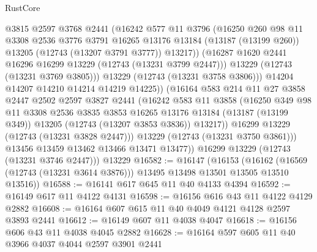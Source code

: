 \begin{lexlean}{RustCore}
\begin{coremodule}
                    @3815
                    @2597
                    @3768
                    @2441
                    (@16242
                      @577
                      @11
                      @3796
                      (@16250
                        @260
                        @98
                        @11
                        @3308
                        @2536
                        @3776
                        @3791
                        @16265
                        @13176
                        @13184
                        (@13187 (@13199 @260))
                        @13205
                        (@12743 (@13207 @3791 @3777))
                        @13217))
                    (@16287 @1620 @2441 @16296 @16299 @13229 (@12743 (@13231 @3799 @2447)))
                    @13229
                    (@12743 (@13231 @3769 @3805)))
                  @13229
                  (@12743 (@13231 @3758 @3806)))
                @14204
                @14207
                @14210
                @14214
                @14219
                @14225))
            (@16164
              @583
              @214
              @11
              @27
              @3858
              @2447
              @2502
              @2597
              @3827
              @2441
              (@16242
                @583
                @11
                @3858
                (@16250
                  @349
                  @98
                  @11
                  @3308
                  @2536
                  @3835
                  @3853
                  @16265
                  @13176
                  @13184
                  (@13187 (@13199 @349))
                  @13205
                  (@12743 (@13207 @3853 @3836))
                  @13217))
              @16299
              @13229
              (@12743 (@13231 @3828 @2447)))
            @13229
            (@12743 (@13231 @3750 @3861)))
          @13456
          @13459
          @13462
          @13466
          @13471
          @13477))
      @16299
      @13229
      (@12743 (@13231 @3746 @2447)))
    @13229
@16582 := @16147
    (@16153
      (@16162 (@16569 (@12743 (@13231 @3614 @3876))) @13495 @13498 @13501 @13505 @13510 @13516))
@16588 := @16141 @617 @645 @11 @40 @4133 @4394
@16592 := @16149 @617 @11 @4122 @4131
@16598 := @16156 @616 @43 @11 @4122 @4129 @2882
@16608 := @16164 @607 @615 @11 @40 @4049 @4121 @4128 @2597 @3893 @2441
@16612 := @16149 @607 @11 @4038 @4047
@16618 := @16156 @606 @43 @11 @4038 @4045 @2882
@16628 := @16164 @597 @605 @11 @40 @3966 @4037 @4044 @2597 @3901 @2441

\end{coremodule}
\end{lexlean}
